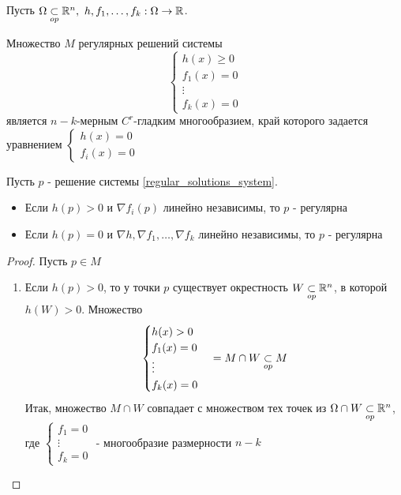 \begin{theorem}
    Пусть $\Omega \underset{op}{\subset} \mathbb{R}^n, \ h, f_1, \hdots, f_k: \Omega \to \mathbb{R}$. 
    \par
    Множество $M$ регулярных решений системы 
    \begin{equation} 
        \begin{cases}
            \label{regular_solutions_system}  
            h(x) \geq 0 \\
            f_1(x) = 0 \\
            \vdots \\
            f_k(x) = 0
        \end{cases}
    \end{equation}
    является $n-k$-мерным $C^r$-гладким многообразием, край которого задается уравнением $\begin{cases*}
        h(x) = 0\\ f_i(x) = 0
    \end{cases*}$

    \begin{definition}
        Пусть $p$ - решение системы \eqref{regular_solutions_system}. 
        \begin{itemize}
            \item Если $h(p) > 0$ и $\nabla f_i(p)$ линейно независимы, то $p$ - регулярна 
            \item Если $h(p) = 0$ и $\nabla h, \nabla f_1, \hdots, \nabla f_k$ линейно независимы, то $p$ - регулярна 
        \end{itemize} 
    \end{definition}

    \begin{proof}
        Пусть $p \in M$
        \begin{enumerate}
            \item Если $h(p) > 0$, то у точки $p$ существует окрестность $W \underset{op}{\subset} \mathbb{R}^n$, в которой $h(W) > 0$.
            Множество 
            \begin{equation}
                \begin{cases}
                    h(x) > 0\\
                    f_1(x) = 0 \\
                    \vdots \\
                    f_k(x) = 0
                \end{cases} = M \cap W \underset{op}{\subset} M
            \end{equation}
            Итак, множество $M \cap W$ совпадает с множеством тех точек из $\Omega \cap W \underset{op}{\subset} \mathbb{R}^n$, где $\begin{cases}
                f_1 = 0 \\ \vdots \\ f_k = 0
            \end{cases}$ - многообразие размерности $n-k$


\end{enumerate}
\end{proof}
\end{theorem}
